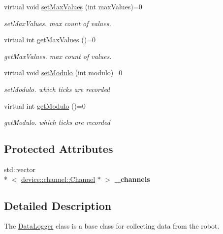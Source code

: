\begin{DoxyCompactItemize}
\item 
virtual void \hyperlink{classdrobot_1_1datalogger_1_1DataLogger_ae90262e477952f8e1c385b84e17d80c6}{set\-Max\-Values} (int max\-Values)=0
\begin{DoxyCompactList}\small\item\em set\-Max\-Values. max count of values. \end{DoxyCompactList}\item 
virtual int \hyperlink{classdrobot_1_1datalogger_1_1DataLogger_a8fe7bb2a626d9f9d5c69f9197490515b}{get\-Max\-Values} ()=0
\begin{DoxyCompactList}\small\item\em get\-Max\-Values. max count of values. \end{DoxyCompactList}\item 
virtual void \hyperlink{classdrobot_1_1datalogger_1_1DataLogger_ae463aebd8cb38c716bef83d5732042b1}{set\-Modulo} (int modulo)=0
\begin{DoxyCompactList}\small\item\em set\-Modulo. which ticks are recorded \end{DoxyCompactList}\item 
virtual int \hyperlink{classdrobot_1_1datalogger_1_1DataLogger_a4dd79d4060e4d4d77451a50777792c0a}{get\-Modulo} ()=0
\begin{DoxyCompactList}\small\item\em get\-Modulo. which ticks are recorded \end{DoxyCompactList}\end{DoxyCompactItemize}
\subsection*{Protected Attributes}
\begin{DoxyCompactItemize}
\item 
\hypertarget{classdrobot_1_1datalogger_1_1DataLogger_a9b2db99bfd6f3b640d1a8f96c9fd9da0}{std\-::vector\\*
$<$ \hyperlink{classdrobot_1_1device_1_1channel_1_1Channel}{device\-::channel\-::\-Channel} $\ast$ $>$ {\bfseries \-\_\-channels}}\label{classdrobot_1_1datalogger_1_1DataLogger_a9b2db99bfd6f3b640d1a8f96c9fd9da0}

\end{DoxyCompactItemize}


\subsection{Detailed Description}
The \hyperlink{classdrobot_1_1datalogger_1_1DataLogger}{Data\-Logger} class is a base class for collecting data from the robot. 

